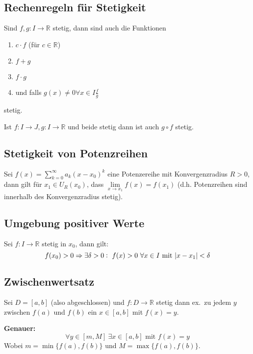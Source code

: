\documentclass[10pt]{article}
\newcommand{\R}{\mathbb{R}}
\begin{document}
    \subsection{Rechenregeln für Stetigkeit}
    Sind $f,g: I \rightarrow \R$ stetig, dann sind auch die Funktionen
    \begin{enumerate}[label= (\alph*)]
        \item $c \cdot f$ (für $c \in \R$)
        \item $f + g$
        \item $f \cdot g$
        \item und falls $g(x) \neq 0 \forall x \in I \frac{f}{g}$
    \end{enumerate}
    stetig.

    Ist $f: I \rightarrow J, g: I \rightarrow \R$ und beide stetig dann
    ist auch $g \circ f$ stetig.

    \subsection{Stetigkeit von Potenzreihen}
    Sei $f(x) = \sum_{k=0}^\infty a_k {(x - x_0)}^k$ eine Potenzereihe mit
    Konvergenzradius $R > 0$, dann gilt für $x_1 \in U_R(x_0)$, dass
    $\lim\limits_{x \rightarrow x_1} f(x) = f(x_1)$ (d.h. Potenzreihen
    sind innerhalb des Konvergenzradius stetig).

    \subsection{Umgebung positiver Werte}
    Sei $f: I \rightarrow \R$ stetig in $x_0$, dann gilt:
    \begin{equation*}
        f(x_0) > 0 \Rightarrow \exists \delta > 0:\ f(x)>0\
        \forall x \in I \text{ mit } \abs{x - x_1} < \delta
    \end{equation*}

    \subsection{Zwischenwertsatz}
    Sei $D = [a, b]$ (also abgeschlossen) und $f: D \rightarrow \R$ stetig dann
    ex.\ zu jedem $y$ zwischen $f(a)$ und $f(b)$ ein $x \in [a,b]$ mit $f(x) =y$.

    \textbf{Genauer:}
    \begin{equation*}
        \forall y \in [m, M]\ \exists x \in [a,b] \text{ mit } f(x)=y
    \end{equation*}
    Wobei $m = \min \{ f(a), f(b) \}$ und $M = \max \{ f(a), f(b) \}$.
\end{document}
